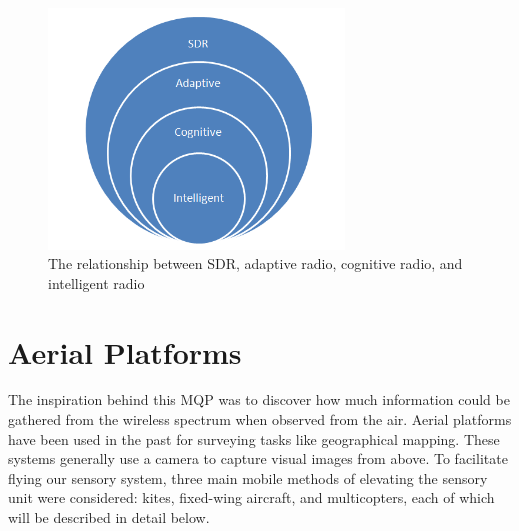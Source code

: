 \begin{figure}[ht]
\centering
\includegraphics[width=0.70\textwidth]{img/sdr_diagram2.png}
\caption{The relationship between SDR, adaptive radio, cognitive radio, and intelligent radio}
\label{fig:sdr_relationship_diagram}
\end{figure}\par

\section{Aerial Platforms}
The inspiration behind this MQP was to discover how much information could be gathered from the wireless spectrum when observed from the air. Aerial platforms have been used in the past for surveying tasks like geographical mapping.\cite{geomap_patent} These systems generally use a camera to capture visual images from above. To facilitate flying our sensory system, three main mobile methods of elevating the sensory unit were considered: kites, fixed-wing aircraft, and multicopters, each of which will be described in detail below.

